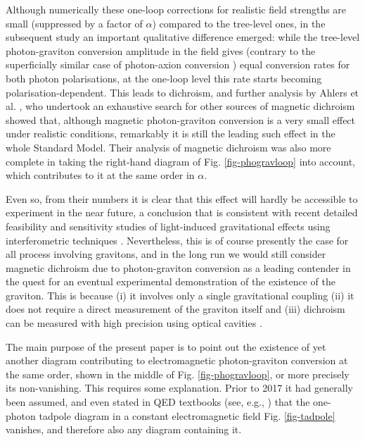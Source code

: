 \documentclass[a4paper,11pt]{article}
\begin{document}
Although numerically these one-loop corrections for realistic field strengths are small (suppressed by a factor of $\alpha$) 
compared to the tree-level ones, in the subsequent study \cite{71} an important qualitative difference emerged: while the tree-level photon-graviton conversion amplitude 
in the field gives (contrary to the superficially similar case of photon-axion conversion \cite{maiani-86,sikivie-83,rafsto,mirizzi-06,masaki-17,chavez-14,tam-12}) equal conversion rates for both photon polarisations, at the one-loop level this rate starts becoming polarisation-dependent.
This leads to dichroism, and further analysis by Ahlers et al. \cite{ahjari}, who undertook an exhaustive search for other sources of magnetic dichroism 
showed that, although magnetic photon-graviton conversion is a very small effect under realistic conditions, remarkably it is still the leading such effect in the whole Standard Model. 
Their analysis of magnetic dichroism was also more complete in taking the right-hand diagram of Fig. \ref{fig-phogravloop} into account, which contributes to it at the same
order in $\alpha$. 

Even so, from their numbers it is clear that this effect will hardly be accessible to experiment in the near future, a conclusion that is consistent with recent detailed feasibility and sensitivity studies of light-induced gravitational effects using interferometric techniques \citep{ralf,francois}.
Nevertheless, this is of course presently the case for all process involving gravitons,
and in the long run we would still consider magnetic dichroism due to photon-graviton conversion as a leading contender in the quest for an eventual experimental demonstration of the existence of the graviton.
This is because (i) it involves only a single gravitational coupling (ii) it does not require a direct measurement of the graviton itself and (iii) dichroism can be measured with high precision using optical cavities \citep{schmitt-21,marx-13,bernhardt-20,QA-06,pvlas1,pvlas2,VMB}.

The main purpose of the present paper is to point out the existence of yet another diagram contributing to electromagnetic photon-graviton conversion at the same order,
 shown in the middle of Fig. \ref{fig-phogravloop}, or more precisely its non-vanishing.
This requires some explanation.
Prior to 2017 it had generally been assumed, and even stated in QED textbooks (see, e.g., \cite{ditreu-book,frgish-book}) that the one-photon tadpole diagram in a constant electromagnetic field Fig. \ref{fig-tadpole} vanishes,
and therefore also any diagram containing it.
\end{document}
